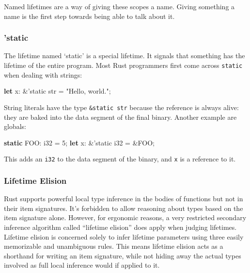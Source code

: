 \documentclass[a4paper,]{book}
\renewcommand*{\hypertarget}[3][\ar]{%
  \def\ar{#2}%
  \label{#1}%
  #3}
\newenvironment{Shaded}{\begin{snugshade}}{\end{snugshade}}
\newcommand{\KeywordTok}[1]{\textcolor[rgb]{0.13,0.29,0.53}{\textbf{{#1}}}}
\newcommand{\DataTypeTok}[1]{\textcolor[rgb]{0.13,0.29,0.53}{{#1}}}
\newcommand{\DecValTok}[1]{\textcolor[rgb]{0.00,0.00,0.81}{{#1}}}
\newcommand{\StringTok}[1]{\textcolor[rgb]{0.31,0.60,0.02}{{#1}}}
\newcommand{\OtherTok}[1]{\textcolor[rgb]{0.56,0.35,0.01}{{#1}}}
\newcommand{\NormalTok}[1]{{#1}}
\begin{document}
Named lifetimes are a way of giving these scopes a name. Giving
something a name is the first step towards being able to talk about it.

\hypertarget{static}{\subsubsection{'static}\label{static}}

The lifetime named `static' is a special lifetime. It signals that
something has the lifetime of the entire program. Most Rust programmers
first come across \texttt{\textquotesingle{}static} when dealing with
strings:

\begin{Shaded}
\begin{Highlighting}[]
\KeywordTok{let} \NormalTok{x: &}\OtherTok{'static} \DataTypeTok{str} \NormalTok{= }\StringTok{"Hello, world."}\NormalTok{;}
\end{Highlighting}
\end{Shaded}

String literals have the type \texttt{\&\textquotesingle{}static\ str}
because the reference is always alive: they are baked into the data
segment of the final binary. Another example are globals:

\begin{Shaded}
\begin{Highlighting}[]
\KeywordTok{static} \NormalTok{FOO: }\DataTypeTok{i32} \NormalTok{= }\DecValTok{5}\NormalTok{;}
\KeywordTok{let} \NormalTok{x: &}\OtherTok{'static} \DataTypeTok{i32} \NormalTok{= &FOO;}
\end{Highlighting}
\end{Shaded}

This adds an \texttt{i32} to the data segment of the binary, and
\texttt{x} is a reference to it.

\hypertarget{lifetime-elision}{\subsubsection{Lifetime
Elision}\label{lifetime-elision}}

Rust supports powerful local type inference in the bodies of functions
but not in their item signatures. It's forbidden to allow reasoning
about types based on the item signature alone. However, for ergonomic
reasons, a very restricted secondary inference algorithm called
``lifetime elision'' does apply when judging lifetimes. Lifetime elision
is concerned solely to infer lifetime parameters using three easily
memorizable and unambiguous rules. This means lifetime elision acts as a
shorthand for writing an item signature, while not hiding away the
actual types involved as full local inference would if applied to it.
\end{document}
